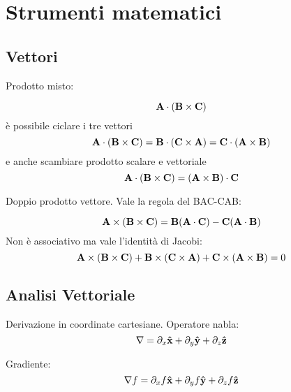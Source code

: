 \section{Strumenti matematici} %
\label{sec:strumenti_matematici}

\subsection{Vettori} %
\label{sub:vettori}

Prodotto misto: 

\begin{equation}
    \mathbf{ A \cdot ( B \times C ) }
\end{equation}
è possibile ciclare i tre vettori
\begin{equation}
    \mathbf{ A \cdot ( B \times C ) } =
    \mathbf{ B \cdot ( C \times A ) } =
    \mathbf{ C \cdot ( A \times B ) }
\end{equation}
e anche scambiare prodotto scalare e vettoriale
\begin{equation}
    \mathbf{ A \cdot ( B \times C ) } = \mathbf{ ( A \times B ) \cdot C }
\end{equation}

Doppio prodotto vettore. Vale la regola del BAC-CAB:

\begin{equation}
    \mathbf{ A \times ( B \times C ) } = \mathbf{ B ( A \cdot C) - C ( A \cdot B) }
\end{equation}
Non è associativo ma vale l'identità di Jacobi:
\begin{equation}
    \mathbf{ A \times ( B \times C ) } +
    \mathbf{ B \times ( C \times A ) } +
    \mathbf{ C \times ( A \times B ) } = 0
\end{equation}


\subsection{Analisi Vettoriale} %
\label{sub:analisi_vettoriale}



Derivazione in coordinate cartesiane. Operatore nabla:
\begin{equation}
    \nabla = \partial_x \mathbf{\hat x } + \partial_y \mathbf{\hat y } + \partial_z \mathbf{\hat z }
\end{equation}

Gradiente: 
\begin{equation}
    \nabla f = \partial_x f \mathbf{\hat x } + \partial_y f \mathbf{\hat y } + \partial_z f \mathbf{\hat z }
\end{equation}

